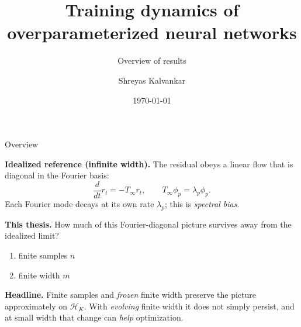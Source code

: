 \documentclass[10pt,aspectratio=169]{beamer}
\title{Training dynamics of overparameterized neural networks}
\subtitle{Overview of results}
\author{Shreyas Kalvankar}
\institute{TU Delft}
\date{\today}
\begin{document}
\maketitle


\begin{frame}{Overview}

	\textbf{Idealized reference (infinite width).}
	The residual obeys a linear flow that is diagonal in the Fourier basis:
	\[
		\frac{d}{dt}r_t=-T_\infty r_t,
		\qquad
		T_\infty\phi_p=\lambda_p\phi_p .
	\]
	Each Fourier mode decays at its own rate \(\lambda_p\); this is \emph{spectral bias}.

	\medskip
	\textbf{This thesis.}
	How much of this Fourier-diagonal picture survives away from the idealized limit?
	\begin{enumerate}
		\item finite samples \(n\)
		\item finite width \(m\)
	\end{enumerate}

	\medskip
	\textbf{Headline.}
	Finite samples and \emph{frozen} finite width preserve the picture approximately on \(\mathcal H_K\).
	With \emph{evolving} finite width it does not simply persist, and at small width that change can
	\emph{help} optimization.


\end{frame}
\end{document}
